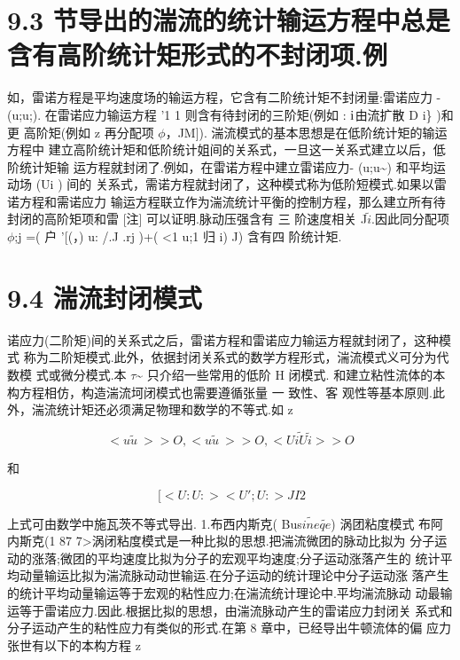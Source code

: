 \section*{9.3  节导出的湍流的统计输运方程中总是含有高阶统计矩形式的不封闭项.例}

如，雷诺方程是平均速度场的输运方程，它含有二阶统计矩不封闭量:雷诺应力 - (u;u;). 在雷诺应力输运方程 '1 1 则含有待封闭的三阶矩(例如 : ${\rm i}$由流扩散 D i\} )和更 高阶矩(例如 z 再分配项 $\phi$，JM]). 湍流模式的基本思想是在低阶统计矩的输运方程中 建立高阶统计矩和低阶统计姐间的关系式，一旦这一关系式建立以后，低阶统计矩输 运方程就封闭了.例如，在雷诺方程中建立雷诺应力- (u;u\textasciitilde{}) 和平均运动场 (Ui ) 间的 关系式，需诺方程就封闭了，这种模式称为低阶短模式.如果以雷诺方程和需诺应力 输运方程联立作为湍流统计平衡的控制方程，那么建立所有待封闭的高阶矩项和雷 [注] 可以证明.脉动压强含有 三 阶速度相关 J$\tilde{i}$.因此同分配项 $\phi$;j =( 户 '[(，) u: /.J .rj )+( <1 u;1 归 i) J) 含有四 阶统计矩.

\section*{9.4  湍流封闭模式}

诺应力(二阶矩)间的关系式之后，雷诺方程和雷诺应力输运方程就封闭了，这种模式 称为二阶矩模式.此外，依据封闭关系式的数学方程形式，湍流模式义可分为代数模 式或微分模式.本 $\tau$\textasciitilde{} 只介绍一些常用的低阶 H 闭模式. 和建立粘性流体的本构方程相仿，构造湍流坷闭模式也需要遵循张量 一 致性、客 观性等基本原则.此外，湍流统计矩还必须满足物理和数学的不等式.如 z

\[<u\tilde{u}~>>O ,  <u\tilde{u}~>>O ,  <U\tilde{iU}\tilde{i}>>O\]

和

\[<u:u:> ~ [<U:U:><U';U:>JI2\]

上式可由数学中施瓦茨不等式导出. 1.布西内斯克( Bus$\tilde{ine}$$\tilde{qe}$) 涡团粘度模式 布阿内斯克(1 87 7>涡闭粘度模式是一种比拟的思想.把湍流微团的脉动比拟为 分子运动的涨落;微团的平均速度比拟为分子的宏观平均速度;分子运动涨落产生的 统计平均动量输运比拟为湍流脉动动世输运.在分子运动的统计理论中分子运动涨 落产生的统计平均动量输运等于宏观的粘性应力;在湍流统计理论中.平均湍流脉动 动最输运等于雷诺应力.因此.根据比拟的思想，由湍流脉动产生的雷诺应力封闭关 系式和分子运动产生的粘性应力有类似的形式.在第 8 章中，已经导出牛顿流体的偏 应力张世有以下的本构方程 z

